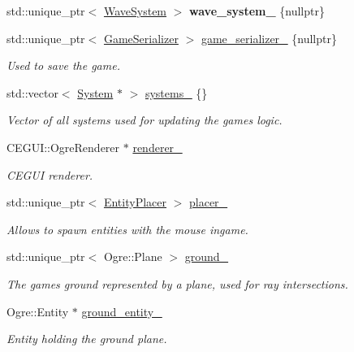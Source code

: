 \begin{DoxyCompactItemize}
\item 
std\+::unique\+\_\+ptr$<$ \hyperlink{class_wave_system}{Wave\+System} $>$ {\bfseries wave\+\_\+system\+\_\+} \{nullptr\}\hypertarget{class_game_aec046435ac5dd6cda77f7e94fd22d06f}{}\label{class_game_aec046435ac5dd6cda77f7e94fd22d06f}

\item 
std\+::unique\+\_\+ptr$<$ \hyperlink{class_game_serializer}{Game\+Serializer} $>$ \hyperlink{class_game_a27543a5588f79f251f5b4cb64026966f}{game\+\_\+serializer\+\_\+} \{nullptr\}
\begin{DoxyCompactList}\small\item\em Used to save the game. \end{DoxyCompactList}\item 
std\+::vector$<$ \hyperlink{class_system}{System} $\ast$ $>$ \hyperlink{class_game_af594421c81bec3f6284ccdb8d3888080}{systems\+\_\+} \{\}
\begin{DoxyCompactList}\small\item\em Vector of all systems used for updating the game\textquotesingle{}s logic. \end{DoxyCompactList}\item 
C\+E\+G\+U\+I\+::\+Ogre\+Renderer $\ast$ \hyperlink{class_game_a55d453a75a2abc8a0b2ba4ad6265b8c3}{renderer\+\_\+}
\begin{DoxyCompactList}\small\item\em C\+E\+G\+UI renderer. \end{DoxyCompactList}\item 
std\+::unique\+\_\+ptr$<$ \hyperlink{class_entity_placer}{Entity\+Placer} $>$ \hyperlink{class_game_a9ce203f7a53ba536a1d7653f7e74d05f}{placer\+\_\+}
\begin{DoxyCompactList}\small\item\em Allows to spawn entities with the mouse ingame. \end{DoxyCompactList}\item 
std\+::unique\+\_\+ptr$<$ Ogre\+::\+Plane $>$ \hyperlink{class_game_a8e687faa09ca8c2f89279eecbe463916}{ground\+\_\+}
\begin{DoxyCompactList}\small\item\em The game\textquotesingle{}s ground represented by a plane, used for ray intersections. \end{DoxyCompactList}\item 
Ogre\+::\+Entity $\ast$ \hyperlink{class_game_a13668cabb42e440fea0f0a2a2b211984}{ground\+\_\+entity\+\_\+}
\begin{DoxyCompactList}\small\item\em Entity holding the ground plane. \end{DoxyCompactList}\item 

\end{DoxyCompactItemize}
